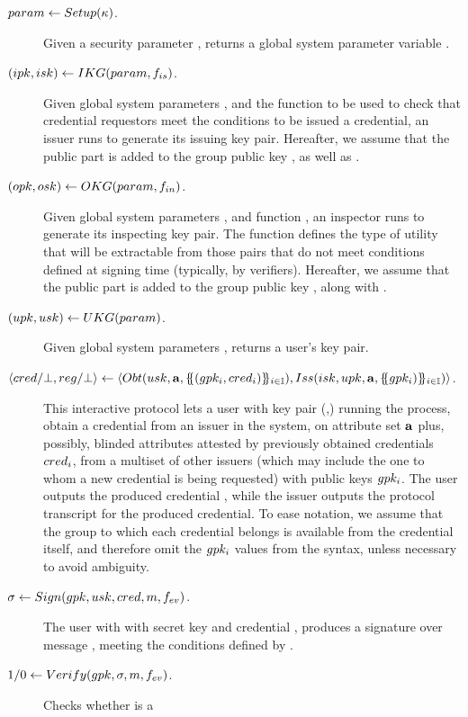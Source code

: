 \begin{description}
\item[$param \gets Setup(\kappa)$.] Given a security parameter \secpar,
  returns a global system parameter variable \parm.
\item[$(ipk,isk) \gets IKG(param,f_{is})$.] Given global system
  parameters \parm, and the function \fissue to be used to check that credential
  requestors meet the conditions to be issued a credential, an issuer runs
  \IKeyGen to generate its issuing key pair. Hereafter, we assume that the
  public part \ipk is added to the group public key \gpk, as well as \fissue.
\item[$(opk,osk) \gets OKG(param,f_{in})$.] Given global system
  parameters \parm, and function \finsp, an inspector runs \OKeyGen to generate
  its inspecting key pair. The function \finsp defines the type of utility that
  will be extractable from those pairs that do not meet conditions defined
  at signing time (typically, by verifiers). Hereafter, we assume that the
  public part \opk is added to the group public key \gpk, along with \finsp.
\item[$(upk,usk) \gets UKG(param)$.] Given global system parameters
  \parm, returns a user's key pair.
\item[$\langle cred/\bot,reg/\bot \rangle \gets
  \langle
  Obt(usk,\mathbf{a},\{\mskip-5mu\{ (gpk_i,cred_i)\}\mskip-5mu\}_{i \in \mathbb{I}}),
  Iss(isk,upk,\mathbf{a},\{\mskip-5mu\{ gpk_i) \}\mskip-5mu\}_{i \in \mathbb{I}})
  \rangle$.] %
  This interactive protocol lets a user with key pair (\upk,\usk) running the
  \Obtain process, obtain a credential \cred from an issuer in the system, on
  attribute set $\mathbf{a}$ plus, possibly, blinded attributes attested by
  previously obtained credentials $cred_i$, from a multiset of other issuers
  (which may include the one to whom a new credential is being requested) with
  public keys $gpk_i$. The user outputs the produced credential \cred, while
  the issuer outputs the protocol transcript \utrans for the produced
  credential. To ease notation, we assume that the group to which each
  credential belongs is available from the credential itself, and therefore
  omit the $gpk_i$ values from the syntax, unless necessary to avoid ambiguity.
\item[$\sigma \gets Sign(gpk,usk,cred,m,f_{ev})$.]
  The user with with secret key \usk and credential \cred, produces a signature
  \sig over message \msg, meeting the conditions defined by \feval.
\item[$1/0 \gets Verify(gpk,\sigma,m,f_{ev})$.] Checks whether \sig is a

\end{description}

